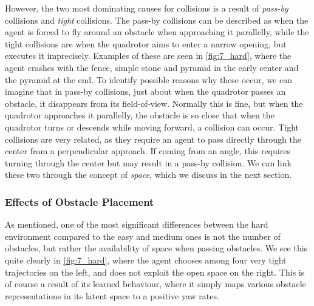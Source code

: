However, the two most dominating causes for collisions is a result of \textit{pass-by} collisions and \textit{tight} collisions. The pass-by collisions can be described as when the agent is forced to fly around an obstacle when approaching it parallelly, while the tight collisions are when the quadrotor aims to enter a narrow opening, but executes it imprecisely. Examples of these are seen in \cref{fig:7_hard}, where the agent crashes with the fence, simple stone and pyramid in the early center and the pyramid at the end. To identify possible reasons why these occur, we can imagine that in pass-by collisions, just about when the quadrotor passes an obstacle, it disappears from its field-of-view. Normally this is fine, but when the quadrotor approaches it parallelly, the obstacle is so close that when the quadrotor turns or descends while moving forward, a collision can occur. Tight collisions are very related, as they require an agent to pass directly through the center from a perpendicular approach. If coming from an angle, this requires turning through the center but may result in a pass-by collision.
We can link these two through the concept of \textit{space}, which we discuss in the next section.


\subsubsection{Effects of Obstacle Placement}
As mentioned, one of the most significant differences between the hard environment compared to the easy and medium ones is not the number of obstacles, but rather the availability of space when passing obstacles. We see this quite clearly in \cref{fig:7_hard}, where the agent chooses among four very tight trajectories on the left, and does not exploit the open space on the right. This is of course a result of its learned behaviour, where it simply maps various obstacle representations in its latent space to a positive yaw rates.

